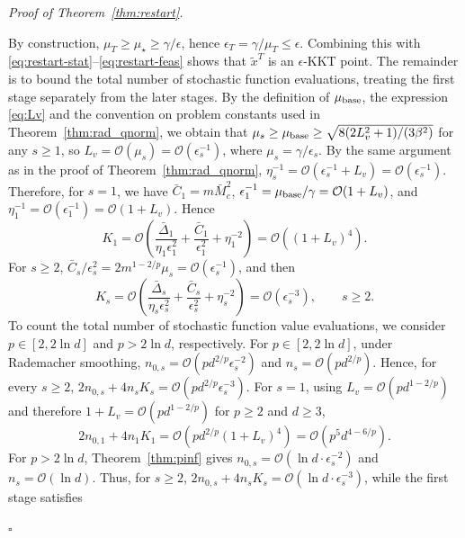 \documentclass[11pt]{article}
\newenvironment{proof}[1][Proof]{%
    \par\noindent\textit{#1.}\enspace
  }{%
    \hfill\ensuremath{\square}\par
  }%
\numberwithin{equation}{section}
\begin{document}
\begin{proof}[Proof of Theorem~\ref{thm:restart}]
By construction, \(\mu_T\ge \mu_\star\ge\gamma/\epsilon\), hence \(\epsilon_T=\gamma/\mu_T\le\epsilon\). Combining this with \eqref{eq:restart-stat}--\eqref{eq:restart-feas} shows that \(\tilde x^T\) is an \(\epsilon\)-KKT point. 
The remainder is to bound the total number of stochastic function evaluations, treating the first stage separately from the later stages. By the definition of \(\mu_{\rm base}\), the expression \eqref{eq:Lv} and the convention on problem constants used in Theorem~\ref{thm:rad_qnorm}, we obtain that \(\mu_s\ge\mu_{\rm base}\ge\sqrt{8(2L_v^2+1)/(3\beta^2)}\) for any $s\ge1$, so \(L_v=\mathcal O(\mu_s)=\mathcal O(\epsilon_s^{-1})\), where \(\mu_s=\gamma/\epsilon_s\). By the same argument as in the proof of Theorem~\ref{thm:rad_qnorm}, \(\eta_s^{-1}=\mathcal O(\epsilon_s^{-1}+L_v)=\mathcal O(\epsilon_s^{-1})\). Therefore, 
for \(s=1\), we have \(\bar C_1=m\bar{M}_c^2\), \(\epsilon_1^{-1}=\mu_{\rm base}/\gamma=\mathcal O(1+L_v)\), and \(\eta_1^{-1}=\mathcal O(\epsilon_1^{-1})=\mathcal O(1+L_v)\). Hence
\[
K_1=\mathcal O(\frac{\bar\Delta_1}{\eta_1\epsilon_1^2}
+\frac{\bar C_1}{\epsilon_1^2}+\eta_1^{-2})
=\mathcal O((1+L_v)^4).
\]
For \(s\ge2\), \(\bar C_s/\epsilon_s^2=2m^{1-2/p}\mu_s=\mathcal O(\epsilon_s^{-1})\), and then 
\[
K_s=\mathcal O(\frac{\bar\Delta_s}{\eta_s\epsilon_s^2}
+\frac{\bar C_s}{\epsilon_s^2}+\eta_s^{-2})
=\mathcal O(\epsilon_s^{-3}),
\qquad s\ge2.
\]
To count the total number of stochastic function value evaluations, we consider \(p\in[2,2\ln d]\) and \(p>2\ln d\), respectively. For $p\in[2,2\ln d]$, under Rademacher smoothing, \(n_{0,s}=\mathcal O(pd^{2/p}\epsilon_s^{-2})\) and \(n_s=\mathcal O(pd^{2/p})\). Hence, for every \(s\ge2\),  \(2n_{0,s}+4n_sK_s=\mathcal O(pd^{2/p}\epsilon_s^{-3})\). For \(s=1\), using \(L_v=\mathcal O(pd^{1-2/p})\) and therefore \(1+L_v=\mathcal O(pd^{1-2/p})\) for \(p\ge2\) and \(d\ge3\),
\[
2n_{0,1}+4n_1K_1
=\mathcal O(pd^{2/p}(1+L_v)^4)
=\mathcal O(p^5d^{4-6/p}).\]  
For \(p>2\ln d\), Theorem~\ref{thm:pinf} gives \(n_{0,s}=\mathcal O(\ln d\cdot\epsilon_s^{-2})\) and \(n_s=\mathcal O(\ln d)\). Thus, for \(s\ge2\), \(2n_{0,s}+4n_sK_s=\mathcal O(\ln d\cdot\epsilon_s^{-3})\), while the first stage satisfies

\end{proof}
\end{document}
